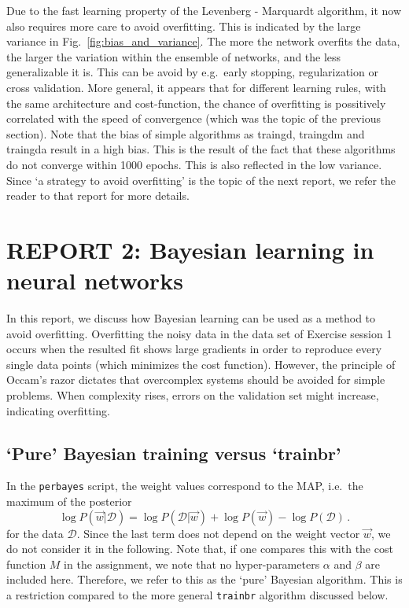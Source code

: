 \documentclass[pdftex,11pt,a4paper]{article}
\begin{document}
Due to the fast learning property of the Levenberg - Marquardt algorithm, it now also requires more care to avoid overfitting. This is indicated by the large variance in Fig.~\ref{fig:bias_and_variance}. The more the network overfits the data, the larger the variation within the ensemble of networks, and the less generalizable it is. This can be avoid by e.g.\ early stopping, regularization or cross validation. More general, it appears that for different learning rules, with the same architecture and cost-function, the chance of overfitting is possitively correlated with the speed of convergence (which was the topic of the previous section). 
Note that the bias of simple algorithms as traingd, traingdm and traingda result in a high bias. This is the result of the fact that these algorithms do not converge within 1000 epochs. This is also reflected in the low variance. 
Since `a strategy to avoid overfitting' is the topic of the next report, we refer the reader to that report for more details.


\FloatBarrier
\newpage
\section{REPORT 2: Bayesian learning in neural networks}
In this report, we discuss how Bayesian learning can be used as a method to avoid overfitting. Overfitting the noisy data in the data set of Exercise session 1 occurs when the resulted fit shows large gradients in order to reproduce every single data points (which minimizes the cost function). However, the principle of Occam's razor dictates that overcomplex systems should be avoided for simple problems. When complexity rises, errors on the validation set might increase, indicating overfitting. 

\subsection{`Pure' Bayesian training versus `trainbr'}
In the \texttt{perbayes} script, the weight values correspond to the MAP, i.e.\ the maximum of the posterior
\begin{equation}
\log P(\vec{w} | \mathcal{D}) = \log P(\mathcal{D} | \vec{w}) + \log P(\vec{w}) - \log P(\mathcal{D}) \,.
\end{equation}
for the data $\mathcal{D}$. Since the last term does not depend on the weight vector $\vec{w}$, we do not consider it in the following. Note that, if one compares this with the cost function $M$ in the assignment, we note that no hyper-parameters $\alpha$ and $\beta$ are included here. Therefore, we refer to this as the `pure' Bayesian algorithm. This is a restriction compared to the more general \texttt{trainbr} algorithm discussed below.
\end{document}
